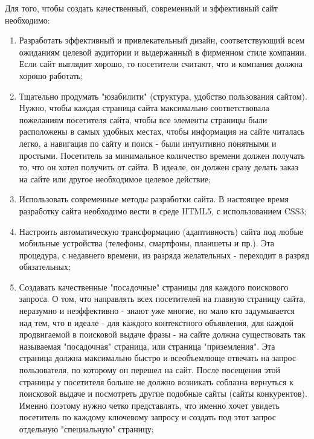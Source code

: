 Для того, чтобы создать качественный, современный и эффективный сайт необходимо:
\begin{enumerate}[label=\arabic*)]
    \item Разработать эффективный и привлекательный дизайн, соответствующий всем ожиданиям целевой аудитории и выдержанный в фирменном стиле компании. Если сайт выглядит хорошо, то посетители считают, что и компания должна хорошо работать;
    \item Тщательно продумать "юзабилити" (структура, удобство пользования сайтом).
    Нужно, чтобы каждая страница сайта максимально соответствовала пожеланиям посетителя сайта, чтобы все элементы страницы были расположены в самых удобных местах, чтобы информация на сайте читалась легко, а навигация по сайту и поиск - были интуитивно понятными и простыми.
    Посетитель за минимальное количество времени должен получать то, что он хотел получить от сайта.
    В идеале, он должен сразу делать заказ на сайте или другое необходимое целевое действие;

    \item Использовать современные методы разработки сайта.
    В настоящее время разработку сайта необходимо вести в среде HTML5, с использованием CSS3;
    \item Настроить автоматическую трансформацию (адаптивность) сайта под любые мобильные устройства (телефоны, смартфоны, планшеты и пр.). Эта процедура, с недавнего времени, из разряда желательных - переходит в разряд обязательных;


    \item Создавать качественные "посадочные" страницы для каждого поискового запроса.
    О том, что направлять всех посетителей на главную страницу сайта, неразумно и неэффективно - знают уже многие, но мало кто задумывается над тем, что в идеале - для каждого контекстного объявления, для каждой продвигаемой в поисковой выдаче фразы - на сайте должна существовать так называемая "посадочная" страница, или страница "приземления".
    Эта страница должна максимально быстро и всеобъемлюще отвечать на запрос пользователя, по которому он перешел на сайт.
    После посещения этой страницы у посетителя больше не должно возникать соблазна вернуться к поисковой выдаче и посмотреть другие подобные сайты (сайты конкурентов).
    Именно поэтому нужно четко представлять, что именно хочет увидеть посетитель по каждому ключевому запросу и создать под этот запрос отдельную "специальную" страницу;


\end{enumerate}
